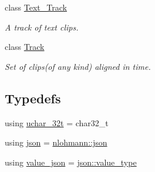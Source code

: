 \begin{DoxyCompactItemize}
class \mbox{\hyperlink{classprz_1_1_text___track}{Text\+\_\+\+Track}}
\begin{DoxyCompactList}\small\item\em A track of text clips. \end{DoxyCompactList}\item 
class \mbox{\hyperlink{classprz_1_1_track}{Track}}
\begin{DoxyCompactList}\small\item\em Set of clips(of any kind) aligned in time. \end{DoxyCompactList}\end{DoxyCompactItemize}
\subsection*{Typedefs}
\begin{DoxyCompactItemize}
\item 
using \mbox{\hyperlink{namespaceprz_a900326d968b998836015a7d742cc941c}{uchar\+\_\+32t}} = char32\+\_\+t
\item 
using \mbox{\hyperlink{namespaceprz_a2d8e9eeb62cf098759f1fff869da67f7}{json}} = \mbox{\hyperlink{namespacenlohmann_a2bfd99e845a2e5cd90aeaf1b1431f474}{nlohmann\+::json}}
\item 
using \mbox{\hyperlink{namespaceprz_a8dc8c96e6ba58afc2c8089b94234c74f}{value\+\_\+json}} = \mbox{\hyperlink{classnlohmann_1_1basic__json_a2b3297873b70c080837e8eedc4fec32f}{json\+::value\+\_\+type}}
\end{DoxyCompactItemize}
